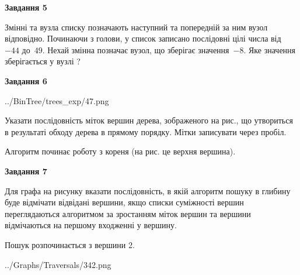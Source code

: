\documentclass[12pt, ukrainian]{article}
\begin{document}
{\begin {large}
{\begin {center}\textbf{Завдання 5}\end {center}}\par
Змінні  та  вузла списку позначають наступний та попередній за ним вузол відповідно. Починаючи з голови, у список записано послідовні цілі числа від~$-44$ до~$49$. Нехай змінна  позначає вузол, що зберігає значення~$-8$.
Яке значення зберігається у вузлі  ?\par
\newpage

{\begin {center}\textbf{Завдання 6}\end {center}}\par

\begin{center}
	{../BinTree/trees_exp/47.png}
\end{center}
Указати послідовність міток вершин дерева, зображеного на рис., що утвориться в результаті обходу дерева в прямому порядку. Мітки записувати через пробіл.\par Алгоритм починає роботу з кореня (на рис. це верхня вершина).\par
\newpage

{\begin {center}\textbf{Завдання 7}\end {center}}\par
Для графа на рисунку вказати послідовність, в якій алгоритм пошуку в глибину буде відмічати відвідані вершини, якщо списки суміжності вершин переглядаються алгоритмом за зростанням міток вершин та вершини відмічаються на першому вход\-женні у вершину.\par
Пошук розпочинається з вершини 2.\par

\begin{center}
	{../Graphs/Traversals/342.png}
\end{center}\par
\newpage


\end{large}}
\end{document}
